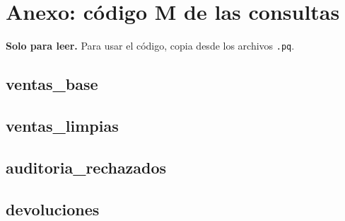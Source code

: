 \documentclass[11pt,letterpaper]{article}
\begin{document}
\section*{Anexo: código M de las consultas}

\textbf{Solo para leer.} Para usar el código, copia desde los archivos \texttt{.pq}.

\subsection*{ventas\_base}

\subsection*{ventas\_limpias}

\subsection*{auditoria\_rechazados}

\subsection*{devoluciones}

\end{document}
